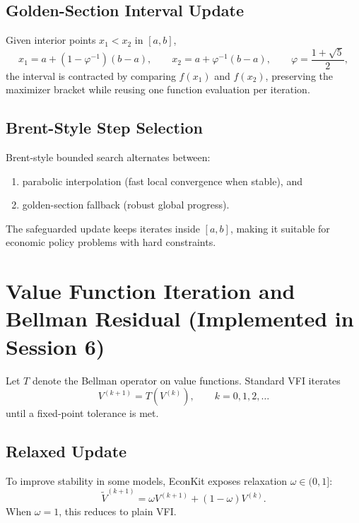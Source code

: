 \documentclass[11pt]{article}
\begin{document}
\subsection{Golden-Section Interval Update}
Given interior points \(x_1 < x_2\) in \([a,b]\),
\begin{equation}
    x_1 = a + (1-\varphi^{-1})(b-a), \qquad
    x_2 = a + \varphi^{-1}(b-a), \qquad
    \varphi = \frac{1+\sqrt{5}}{2},
\end{equation}
the interval is contracted by comparing \(f(x_1)\) and \(f(x_2)\), preserving
the maximizer bracket while reusing one function evaluation per iteration.

\subsection{Brent-Style Step Selection}
Brent-style bounded search alternates between:
\begin{enumerate}
    \item parabolic interpolation (fast local convergence when stable), and
    \item golden-section fallback (robust global progress).
\end{enumerate}
The safeguarded update keeps iterates inside \([a,b]\), making it suitable for
economic policy problems with hard constraints.

\section{Value Function Iteration and Bellman Residual (Implemented in Session 6)}
Let \(T\) denote the Bellman operator on value functions. Standard VFI iterates
\begin{equation}
    V^{(k+1)} = T\left(V^{(k)}\right), \qquad k=0,1,2,\dots
\end{equation}
until a fixed-point tolerance is met.

\subsection{Relaxed Update}
To improve stability in some models, EconKit exposes relaxation
\(\omega \in (0,1]\):
\begin{equation}
    \widetilde{V}^{(k+1)} = \omega V^{(k+1)} + (1-\omega)V^{(k)}.
\end{equation}
When \(\omega=1\), this reduces to plain VFI.
\end{document}
